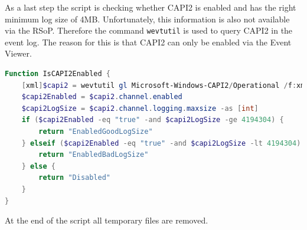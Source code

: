 As a last step the script is checking whether CAPI2 is enabled and has the right minimum log size of 4MB. Unfortunately, this information is also not available via the RSoP. Therefore the command \lstinline|wevtutil| is used to query CAPI2 in the event log. The reason for this is that CAPI2 can only be enabled via the Event Viewer. \cite{CAPI2} 
\begin{lstlisting}[caption=Function IsCAPI2Enabled, language=PowerShell]
Function IsCAPI2Enabled {
    [xml]$capi2 = wevtutil gl Microsoft-Windows-CAPI2/Operational /f:xml
    $capi2Enabled = $capi2.channel.enabled
    $capi2LogSize = $capi2.channel.logging.maxsize -as [int]
    if ($capi2Enabled -eq "true" -and $capi2LogSize -ge 4194304) {
        return "EnabledGoodLogSize"
    } elseif ($capi2Enabled -eq "true" -and $capi2LogSize -lt 4194304) {
        return "EnabledBadLogSize"
    } else {
        return "Disabled"
    }
}    
\end{lstlisting}
At the end of the script all temporary files are removed.